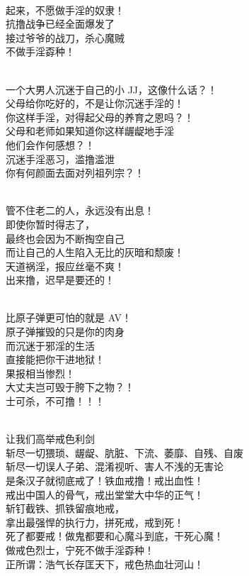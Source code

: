 \begin{poem}[《抗撸战争》]
    \begin{multicols}{2}
        \begin{center}~\\
            起来，不愿做手淫的奴隶！ \\ 抗撸战争已经全面爆发了 \\ 接过爷爷的战刀，杀心魔贼 \\ 不做手淫孬种！

            ~\\

            一个大男人沉迷于自己的小 JJ，这像什么话？！ \\ 父母给你吃好的，不是让你沉迷手淫的！ \\ 你这样手淫，对得起父母的养育之恩吗？！ \\ 父母和老师如果知道你这样龌龊地手淫 \\ 他们会作何感想？！ \\ 沉迷手淫恶习，滥撸滥泄 \\ 你有何颜面去面对列祖列宗？！

            ~\\

            管不住老二的人，永远没有出息！ \\             即使你暂时得志了， \\             最终也会因为不断掏空自己 \\             而让自己的人生陷入无比的灰暗和颓废！ \\             天道祸淫，报应丝毫不爽！ \\             出来撸，迟早是要还的！

            ~\\

            比原子弹更可怕的就是 AV！ \\ 原子弹摧毁的只是你的肉身 \\ 而沉迷于邪淫的生活 \\ 直接能把你干进地狱！ \\ 果报相当惨烈！ \\ 大丈夫岂可毁于胯下之物？！ \\ 士可杀，不可撸！！！

            ~\\

            让我们高举戒色利剑 \\ 斩尽一切猥琐、龌龊、肮脏、下流、萎靡、自残、自废 \\ 斩尽一切误人子弟、混淆视听、害人不浅的无害论 \\ 是条汉子就彻底戒了！铁血戒撸！戒出血性！ \\ 戒出中国人的骨气，戒出堂堂大中华的正气！ \\ 斩钉截铁、抓铁留痕地戒， \\ 拿出最强悍的执行力，拼死戒，戒到死！ \\ 死了都要戒！做鬼都要和心魔斗到底，干死心魔！ \\ 做戒色烈士，宁死不做手淫孬种！ \\ 正所谓：浩气长存匡天下，戒色热血壮河山！
        \end{center}
    \end{multicols}
\end{poem}

